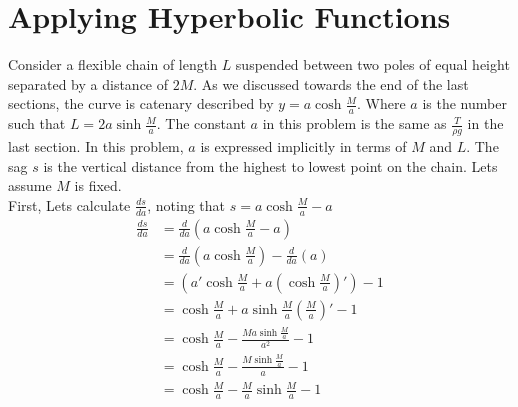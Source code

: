 \documentclass[12pt]{article}
\begin{document}
\section{Applying Hyperbolic Functions}

Consider a flexible chain of length $L$ suspended between two poles of equal height separated by a distance of $2M$. As we discussed towards the end of the last sections, the curve is catenary described by $y = a \cosh{\frac{M}{a}}$. Where $a$ is the number such that $L = 2a\sinh{\frac{M}{a}}$. The constant $a$ in this problem is the same as $\frac{T}{\rho g}$ in the last section. In this problem, $a$ is expressed implicitly in terms of $M$ and $L$. The sag $s$ is the vertical distance from the highest to lowest point on the chain.
\newline
\newline
Lets assume $M$ is fixed. \\
\indent First, Lets calculate $\frac{ds}{da}$, noting that $s = a\cosh{\frac{M}{a}} - a$ \\
\begin{align} \nonumber
\frac{ds}{da} &= \frac{d}{da}\left( a \cosh{\frac{M}{a}} - a\right) \\ \nonumber
&= \frac{d}{da}\left( a \cosh{\frac{M}{a}}\right) - \frac{d}{da} \left(a\right) \\ \nonumber
&= \left(a' \cosh{\frac{M}{a}} + a \left(\cosh{\frac{M}{a}}\right)' \right) - 1 \\ \nonumber
&= \cosh{\frac{M}{a}} + a \sinh{\frac{M}{a}}\left( \frac{M}{a} \right)' -1 \\ \nonumber
&= \cosh{\frac{M}{a}} - \frac{M a \sinh{\frac{M}{a}}}{a^2} -1 \\ \nonumber
&= \cosh{\frac{M}{a}} - \frac{M \sinh{\frac{M}{a}}}{a} -1 \\ \nonumber
&= \cosh{\frac{M}{a}} - \frac{M}{a} \sinh{\frac{M}{a}} -1 \\ \nonumber
\end{align}
\end{document}
